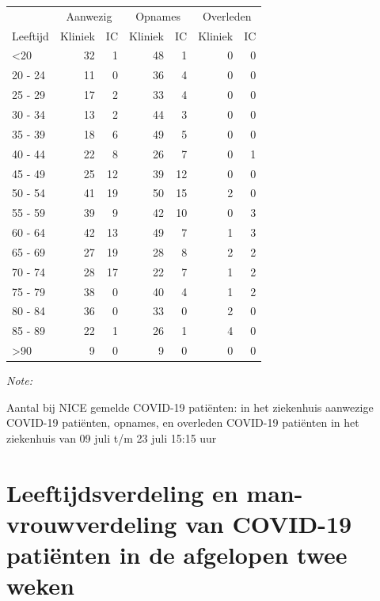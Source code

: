 \documentclass[
  english,
  man,floatsintext]{apa6}
\begin{document}
\begin{table}
\centering\begingroup\fontsize{10}{12}\selectfont

\begin{threeparttable}
\begin{tabular}{lrrrrrr}
\toprule
\multicolumn{1}{c}{ } & \multicolumn{2}{c}{Aanwezig} & \multicolumn{2}{c}{Opnames} & \multicolumn{2}{c}{Overleden} \\
\cmidrule(l{3pt}r{3pt}){2-3} \cmidrule(l{3pt}r{3pt}){4-5} \cmidrule(l{3pt}r{3pt}){6-7}
Leeftijd & Kliniek & IC & Kliniek & IC & Kliniek & IC\\
\midrule
<20 & 32 & 1 & 48 & 1 & 0 & 0\\
20 - 24 & 11 & 0 & 36 & 4 & 0 & 0\\
25 - 29 & 17 & 2 & 33 & 4 & 0 & 0\\
30 - 34 & 13 & 2 & 44 & 3 & 0 & 0\\
35 - 39 & 18 & 6 & 49 & 5 & 0 & 0\\
40 - 44 & 22 & 8 & 26 & 7 & 0 & 1\\
45 - 49 & 25 & 12 & 39 & 12 & 0 & 0\\
50 - 54 & 41 & 19 & 50 & 15 & 2 & 0\\
55 - 59 & 39 & 9 & 42 & 10 & 0 & 3\\
60 - 64 & 42 & 13 & 49 & 7 & 1 & 3\\
65 - 69 & 27 & 19 & 28 & 8 & 2 & 2\\
70 - 74 & 28 & 17 & 22 & 7 & 1 & 2\\
75 - 79 & 38 & 0 & 40 & 4 & 1 & 2\\
80 - 84 & 36 & 0 & 33 & 0 & 2 & 0\\
85 - 89 & 22 & 1 & 26 & 1 & 4 & 0\\
>90 & 9 & 0 & 9 & 0 & 0 & 0\\
\bottomrule
\end{tabular}
\begin{tablenotes}
\item \textit{Note: } 
\item Aantal bij NICE gemelde COVID-19 patiënten: in het ziekenhuis aanwezige COVID-19 patiënten, opnames, en overleden COVID-19 patiënten in het ziekenhuis van 09 juli t/m 23 juli 15:15 uur
\end{tablenotes}
\end{threeparttable}
\endgroup{}
\end{table}

\newpage

\hypertarget{leeftijdsverdeling-en-man-vrouwverdeling-van-covid-19-patiuxebnten-in-de-afgelopen-twee-weken}{%
\section{Leeftijdsverdeling en man-vrouwverdeling van COVID-19 patiënten in de afgelopen twee weken}\label{leeftijdsverdeling-en-man-vrouwverdeling-van-covid-19-patiuxebnten-in-de-afgelopen-twee-weken}}
\end{document}
